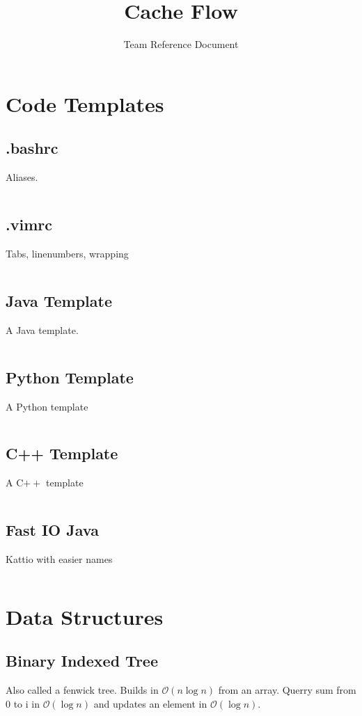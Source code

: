 \documentclass[8pt,a4paper,landscape,oneside]{amsart}
\title{Cache Flow}
\subtitle{Team Reference Document}
\date{\ddmmyyyydate{\today{}}}
\newcommand{\codej}[1]{\inputminted[fontsize=\large,baselinestretch=1]{java}{code/#1}}
\newcommand{\codec}[1]{\inputminted[fontsize=\large,baselinestretch=1]{cpp}{code/#1}}
\newcommand{\codep}[1]{\inputminted[fontsize=\large,baselinestretch=1]{py}{code/#1}}
\newcommand{\codeb}[1]{\inputminted[fontsize=\large,baselinestretch=1]{bash}{code/#1}}
\newcommand{\codev}[1]{\inputminted[fontsize=\large,baselinestretch=1]{vim}{code/#1}}
\newcommand{\bigO}{\mathcal{O}}
\begin{document}
\begin{multicols*}{2}
\maketitle
\thispagestyle{fancy}
\vspace{-3em}

\tableofcontents
\begin{large}
\section{Code Templates}
    \subsection{.bashrc}
        Aliases.
        \codeb{.bashrc}
    \subsection{.vimrc}
        Tabs, linenumbers, wrapping
        \codev{.vimrc}
    \subsection{Java Template}
        A Java template.
        \codej{template.java}
    \subsection{Python Template}
        A Python template
        \codep{template.py}
    \subsection{C++ Template}
        A C$++$ template
        \codec{template.cpp}
    \subsection{Fast IO Java}
        Kattio with easier names
        \codej{fastio.java}

\section{Data Structures}
    \subsection{Binary Indexed Tree}
        Also called a fenwick tree. Builds in $\bigO(n \log{n})$ from an array. Querry sum from 0 to i in $\bigO(\log{n})$ and updates an element in $\bigO(\log{n})$.
        \codej{DS/BIT.java}

\end{large}
\end{multicols*}
\end{document}
